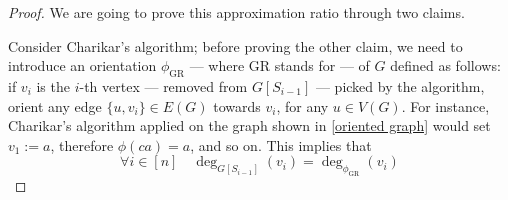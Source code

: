 \documentclass[a4paper, 12pt]{report}
\begin{document}
    \begin{proof}
        We are going to prove this approximation ratio through two claims.


        Consider Charikar's algorithm; before proving the other claim, we need to introduce an orientation $\phi_\mathrm{GR}$ --- where GR stands for  --- of $G$ defined as follows: if $v_i$ is the $i$-th vertex --- removed from $G[S_{i - 1}]$ --- picked by the algorithm, orient any edge $\{u, v_i\} \in E(G)$ towards $v_i$, for any $u \in V(G)$. For instance, Charikar's algorithm applied on the graph shown in \cref{oriented graph} would set $v_1 := a$, therefore $\phi(ca) = a$, and so on. This implies that $$\forall i \in [n] \quad \deg_{G[S_{i - 1}]}(v_i) = \deg_{\phi_\mathrm{GR}}(v_i)$$


\end{proof}
\end{document}
